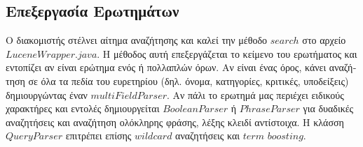 \subsection{\textgreek{Επεξεργασία Ερωτημάτων}}
\textgreek {
    Ο διακομιστής στέλνει αίτημα αναζήτησης και καλεί την μέθοδο $search$ στο αρχείο $LuceneWrapper.java$.
    Η μέθοδος αυτή επεξεργάζεται το κείμενο του ερωτήματος και εντοπίζει αν είναι ερώτημα ενός ή πολλαπλών όρων.
    Αν είναι ένας όρος, κάνει αναζήτηση σε όλα τα πεδία του ευρετηρίου (δηλ. όνομα, κατηγορίες, κριτικές, υποδείξεις)
    δημιουργώντας έναν $multiFieldParser$.
    Αν πάλι το ερωτημά μας περιέχει ειδικούς χαρακτήρες και εντολές δημιουργείται $BooleanParser$ ή $PhraseParser$ για
    δυαδικές αναζητήσεις και αναζήτηση ολόκληρης φράσης, λέξης κλειδί αντίστοιχα.
    Η κλάσση $QueryParser$ επιτρέπει επίσης $wildcard$ αναζητήσεις και $term$ $boosting$.
}


